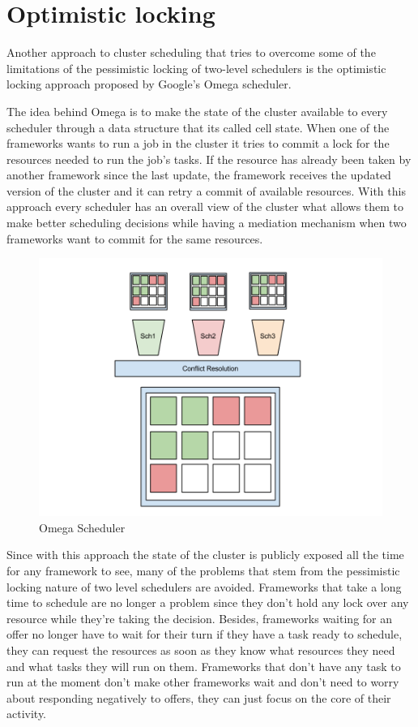 \documentclass{svjour3}                     %
\begin{document}
\section{Optimistic locking}

\label{sec:omega}

Another approach to cluster scheduling that tries to overcome some of
the limitations of the pessimistic locking of two-level schedulers is
the optimistic locking approach proposed by Google's Omega
scheduler.

The idea behind Omega is to make the state of the cluster available to
every scheduler through a data structure that its called cell
state. When one of the frameworks wants to run a job in the cluster it
tries to commit a lock for the resources needed to run the job's
tasks. If the resource has already been taken by another framework
since the last update, the framework receives the updated version of
the cluster and it can retry a commit of available resources. With
this approach every scheduler has an overall view of the cluster what
allows them to make better scheduling decisions while having a
mediation mechanism when two frameworks want to commit for the same 
resources.

\begin{figure}[!ht]
  \centering
  \includegraphics[scale=0.25,natwidth=960,natheight=720]{Omega.png}
  \caption{Omega Scheduler}
  \label{fig:omega}
\end{figure}

Since with this approach the state of the cluster is publicly exposed all the
time for any framework to see, many of the problems that stem from the 
pessimistic locking nature of two level schedulers are avoided.  Frameworks
that take a long time to schedule are no longer a problem since they don't
hold any lock over any resource while they're taking the decision. Besides,
frameworks waiting for an offer no longer have to wait for their turn if they
have a task ready to schedule, they can request the resources as soon as they
know what resources they need and what tasks they will run on them. Frameworks
that don't have any task to run at the moment don't make other frameworks wait
and don't need to worry about responding negatively to offers, they can just
focus on the core of their activity.
\end{document}
